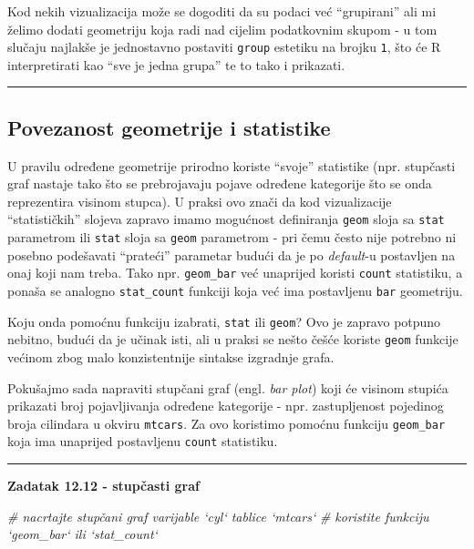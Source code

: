 \documentclass[]{book}
\newenvironment{Shaded}{\begin{snugshade}}{\end{snugshade}}
\newcommand{\CommentTok}[1]{\textcolor[rgb]{0.56,0.35,0.01}{\textit{#1}}}
\theoremstyle{definition}
\theoremstyle{definition}
\theoremstyle{definition}
\theoremstyle{remark}
\begin{document}
Kod nekih vizualizacija može se dogoditi da su podaci već ``grupirani''
ali mi želimo dodati geometriju koja radi nad cijelim podatkovnim skupom
- u tom slučaju najlakše je jednostavno postaviti \texttt{group}
estetiku na brojku \texttt{1}, što će R interpretirati kao ``sve je
jedna grupa'' te to tako i prikazati.

\begin{center}\rule{0.5\linewidth}{\linethickness}\end{center}

\subsection{Povezanost geometrije i
statistike}\label{povezanost-geometrije-i-statistike}

U pravilu određene geometrije prirodno koriste ``svoje'' statistike
(npr. stupčasti graf nastaje tako što se prebrojavaju pojave određene
kategorije što se onda reprezentira visinom stupca). U praksi ovo znači
da kod vizualizacije ``statističkih'' slojeva zapravo imamo mogućnost
definiranja \texttt{geom} sloja sa \texttt{stat} parametrom ili
\texttt{stat} sloja sa \texttt{geom} parametrom - pri čemu često nije
potrebno ni posebno podešavati ``prateći'' parametar budući da je po
\emph{default}-u postavljen na onaj koji nam treba. Tako npr.
\texttt{geom\_bar} već unaprijed koristi \texttt{count} statistiku, a
ponaša se analogno \texttt{stat\_count} funkciji koja već ima
postavljenu \texttt{bar} geometriju.

Koju onda pomoćnu funkciju izabrati, \texttt{stat} ili \texttt{geom}?
Ovo je zapravo potpuno nebitno, budući da je učinak isti, ali u praksi
se nešto češće koriste \texttt{geom} funkcije većinom zbog malo
konzistentnije sintakse izgradnje grafa.

Pokušajmo sada napraviti stupčani graf (engl. \emph{bar plot}) koji će
visinom stupića prikazati broj pojavljivanja određene kategorije - npr.
zastupljenost pojedinog broja cilindara u okviru \texttt{mtcars}. Za ovo
koristimo pomoćnu funkciju \texttt{geom\_bar} koja ima unaprijed
postavljenu \texttt{count} statistiku.

\begin{center}\rule{0.5\linewidth}{\linethickness}\end{center}

\textbf{Zadatak 12.12 - stupčasti graf}

\begin{Shaded}
\begin{Highlighting}[]
\CommentTok{# nacrtajte stupčani graf varijable `cyl` tablice `mtcars` }
\CommentTok{# koristite funkciju `geom_bar` ili `stat_count`}
\end{Highlighting}
\end{Shaded}
\end{document}
